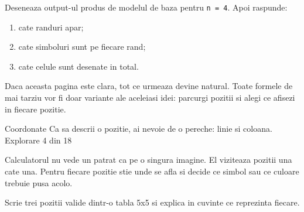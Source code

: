\begin{guidebox}[Trace pentru n = 4]
Deseneaza output-ul produs de modelul de baza pentru \texttt{n = 4}. Apoi raspunde:
\begin{enumerate}
\item cate randuri apar;
\item cate simboluri sunt pe fiecare rand;
\item cate celule sunt desenate in total.
\end{enumerate}
\end{guidebox}

\begin{missionbox}
Daca aceasta pagina este clara, tot ce urmeaza devine natural. Toate formele de mai tarziu vor fi doar variante ale aceleiasi idei: parcurgi pozitii si alegi ce afisezi in fiecare pozitie.
\end{missionbox}

\clearpage

\PageHeader
  {Coordonate}
  {Ca sa descrii o pozitie, ai nevoie de o pereche: linie si coloana.}
  {Explorare 4 din 18}

\begin{minipage}[t]{0.48\linewidth}
\begin{checkpointbox}[Grid 5x5]
\begin{center}
\end{center}
\end{checkpointbox}
\end{minipage}
\hfill
\begin{minipage}[t]{0.48\linewidth}
\begin{missionbox}
Calculatorul nu vede un patrat ca pe o singura imagine. El viziteaza pozitii una cate una. Pentru fiecare pozitie stie unde se afla si decide ce simbol sau ce culoare trebuie pusa acolo.
\end{missionbox}
\end{minipage}

\begin{semibox}[Aplicam]
Scrie trei pozitii valide dintr-o tabla 5x5 si explica in cuvinte ce reprezinta fiecare.
\end{semibox}


